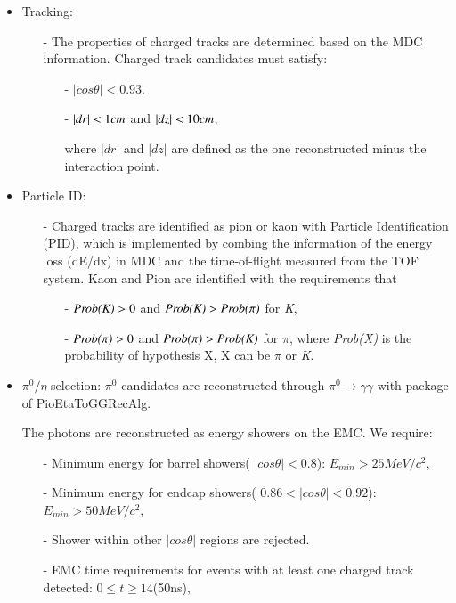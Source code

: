 \begin{itemize}
	\item Tracking:
		\begin{itemize}
			\item[-] The properties of charged tracks are determined based on the MDC information. Charged track candidates must satisfy:
				\begin{itemize}
					\item[-] $|cos\theta| < 0.93$.
					\item[-] $|dr| < \boldmath 1cm$ and $|dz| < \boldmath 10cm$,

						where $|dr|$ and $|dz|$ are defined as the one reconstructed minus the interaction point.
				\end{itemize}
		\end{itemize}
	\item Particle ID:
		\begin{itemize}
			\item[-] Charged tracks are identified as pion or kaon with Particle Identification (PID), which is implemented by combing the information of the energy loss (dE/dx) in MDC and the time-of-flight measured from
				the TOF system. Kaon and Pion are identified with the requirements that 
				\begin{itemize}
					\item[-] $\emph{Prob(K)} > 0$ and $\emph{Prob(K)} > \emph{Prob($\pi$)}$ for \emph{K},
					\item[-] $\emph{Prob($\pi$)} > 0$ and $\emph{Prob($\pi$)} > \emph{Prob(K)}$ for \emph{$\pi$},
						where \emph{Prob(X)} is the probability of hypothesis X, X can be \emph{$\pi$} or \emph{K}.
				\end{itemize}
		\end{itemize}
	\item $\pi^{0}/\eta$ selection: $\pi^{0}$ candidates are reconstructed through $\pi^{0} \rightarrow \gamma\gamma$ with package of PioEtaToGGRecAlg.
		

		The photons are reconstructed as energy showers on the EMC. We require:
		\begin{itemize}
			\item[-] Minimum energy for barrel showers( $|cos\theta| < 0.8$): $E_{min} >25MeV/c^{2}$,
			\item[-] Minimum energy for endcap showers( $0.86 < |cos\theta| < 0.92$): $E_{min} >50MeV/c^{2}$,
			\item[-] Shower within other $|cos\theta|$ regions are rejected.
			\item[-] EMC time requirements for events with at least one charged track detected: $0 \le t \ge 14 $(50ns),
		\end{itemize}


\end{itemize}

